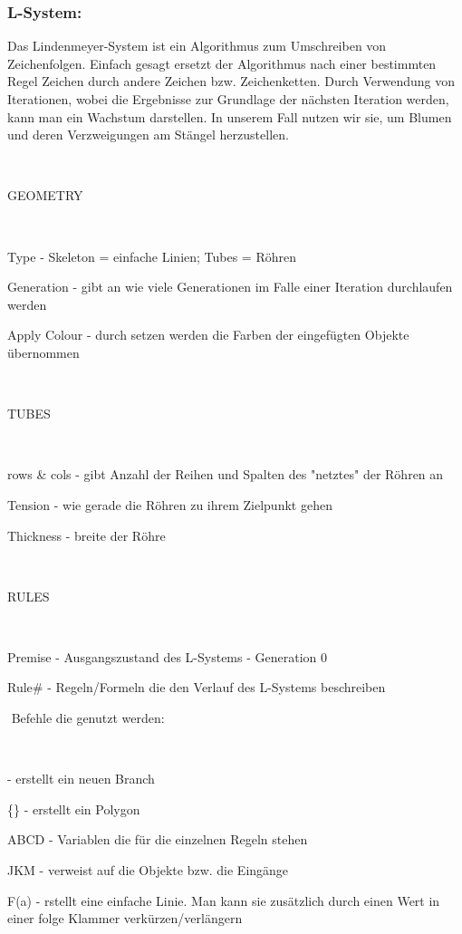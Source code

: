 \subsubsection*{​L-System:}
Das Lindenmeyer-System ist ein Algorithmus zum Umschreiben von Zeichenfolgen. Einfach gesagt ersetzt der Algorithmus nach einer bestimmten Regel Zeichen durch andere Zeichen bzw. Zeichenketten.
Durch Verwendung von Iterationen, wobei die Ergebnisse zur Grundlage der nächsten Iteration werden, kann man ein Wachstum darstellen. In unserem Fall nutzen wir sie, um Blumen und deren Verzweigungen am Stängel herzustellen. 
\begin{​itemize}​
\item GEOMETRY	\begin{​itemize}​
			\item Type - Skeleton = einfache Linien; Tubes = Röhren
			\item Generation - gibt an wie viele Generationen im Falle einer Iteration durchlaufen werden
			\item Apply Colour - durch setzen werden die Farben der eingefügten Objekte übernommen
		\end{​itemize}​
\item TUBES	\begin{​itemize}​
		\item rows & cols - gibt Anzahl der Reihen und Spalten des "netztes" der Röhren an
		\item Tension - wie gerade die Röhren zu ihrem Zielpunkt gehen
		\item Thickness - breite der Röhre
		\end{​itemize}​
\item RULES		\begin{​itemize}​
			\item Premise - Ausgangszustand des L-Systems - Generation 0
			\item Rule\#   - Regeln/Formeln die den Verlauf des L-Systems beschreiben
		\end{​itemize}​
Befehle die genutzt werden:  
\begin{​itemize}​
\item [] - erstellt ein neuen Branch
\item \{\} - erstellt ein Polygon
\item ABCD - Variablen die für die einzelnen Regeln stehen
\item JKM - verweist auf die Objekte bzw. die Eingänge 
\item F(a) -  rstellt eine einfache Linie. Man kann sie zusätzlich durch einen Wert in einer folge Klammer verkürzen/verlängern

\end{​itemize}
\end{​itemize}
